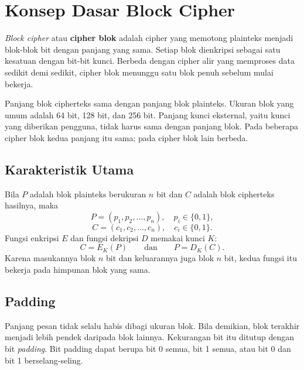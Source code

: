 \section{Konsep Dasar Block Cipher}

\textit{Block cipher} atau \textbf{cipher blok} adalah cipher yang memotong
plainteks menjadi blok-blok bit dengan panjang yang sama. Setiap blok
dienkripsi sebagai satu kesatuan dengan bit-bit kunci. Berbeda dengan cipher
alir yang memproses data sedikit demi sedikit, cipher blok menunggu satu blok
penuh sebelum mulai bekerja.

Panjang blok cipherteks sama dengan panjang blok plainteks. Ukuran blok yang
umum adalah 64 bit, 128 bit, dan 256 bit. Panjang kunci eksternal, yaitu kunci
yang diberikan pengguna, tidak harus sama dengan panjang blok. Pada beberapa
cipher blok kedua panjang itu sama; pada cipher blok lain berbeda.

\subsection{Karakteristik Utama}

Bila $P$ adalah blok plainteks berukuran $n$ bit dan $C$ adalah blok cipherteks
hasilnya, maka
\begin{equation}
P = (p_1, p_2, \dots, p_n), \quad p_i \in \{0,1\},
\label{eq:blok-plainteks}
\end{equation}
\begin{equation}
C = (c_1, c_2, \dots, c_n), \quad c_i \in \{0,1\}.
\label{eq:blok-cipherteks}
\end{equation}
Fungsi enkripsi $E$ dan fungsi dekripsi $D$ memakai kunci $K$:
\begin{equation}
C = E_K(P) \qquad \text{dan} \qquad P = D_K(C).
\label{eq:block-encrypt-decrypt}
\end{equation}
Karena masukannya blok $n$ bit dan keluarannya juga blok $n$ bit, kedua fungsi
itu bekerja pada himpunan blok yang sama.

\subsection{Padding}

Panjang pesan tidak selalu habis dibagi ukuran blok. Bila demikian, blok
terakhir menjadi lebih pendek daripada blok lainnya. Kekurangan bit itu ditutup
dengan bit \textit{padding}. Bit padding dapat berupa bit 0 semua, bit 1 semua,
atau bit 0 dan bit 1 berselang-seling.

